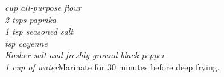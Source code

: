 \begin{minipage}{\linewidth}
\end{minipage}\par\begin{minipage}{\linewidth} 
\textit{ cup all-purpose flour
\\ 2 tsps paprika 
\\ 1 tsp seasoned salt 
\\  tsp cayenne 
\\ Kosher salt and freshly ground black pepper
\\ 1 cup of water}{Marinate for 30 minutes before deep frying.}

\end{minipage}